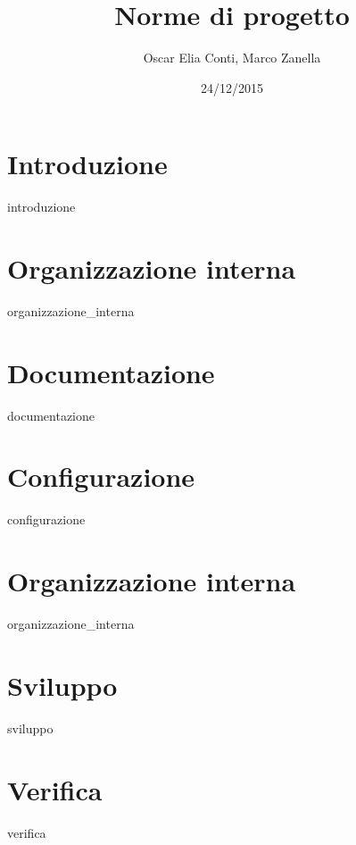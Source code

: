\documentclass[a4paper,twoside,12pt]{article}
\title{Norme di progetto}
\author{Oscar Elia Conti, Marco Zanella}
\date{24/12/2015}
\begin{document}
	\maketitle
	
	\newpage

	\tableofcontents

	\newpage
	
	\newpage
	\section{Introduzione}
		{introduzione}


	\newpage
	\section{Organizzazione interna}
		{organizzazione_interna}
	
	\newpage
	\section{Documentazione}
		{documentazione}

	\newpage
	\section{Configurazione}
		{configurazione}

	\newpage
	\section{Organizzazione interna}
		{organizzazione_interna}
		
	\newpage
	\section{Sviluppo}
		{sviluppo}
		
	\newpage
	\section{Verifica}
		{verifica}
\end{document}

